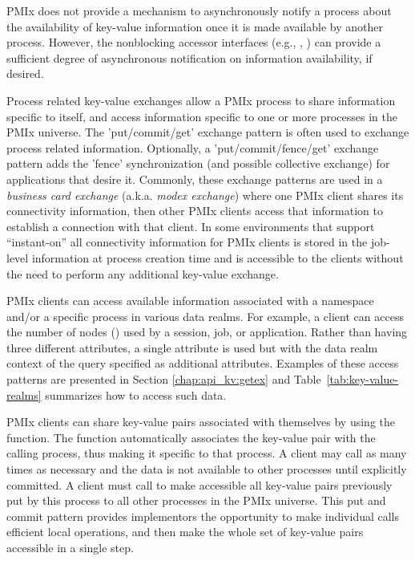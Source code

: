 \ac{PMIx} does not provide a mechanism to asynchronously notify a process about the availability of key-value information once it is made available by another process.
However, the nonblocking accessor interfaces (e.g., , ) can provide a sufficient degree of asynchronous notification on information availability, if desired.

Process related key-value exchanges allow a \ac{PMIx} process to share information specific to itself, and access information specific to one or more processes in the \ac{PMIx} universe.
The 'put/commit/get' exchange pattern is often used to exchange process related information.
Optionally, a 'put/commit/fence/get' exchange pattern adds the 'fence' synchronization (and possible collective exchange) for applications that desire it.
Commonly, these exchange patterns are used in a \emph{business card exchange} (a.k.a. \emph{modex exchange}) where one \ac{PMIx} client shares its connectivity information, then other \ac{PMIx} clients access that information to establish a connection with that client.
In some environments that support ``instant-on'' all connectivity information for \ac{PMIx} clients is stored in the job-level information at process creation time and is accessible to the clients without the need to perform any additional key-value exchange.

\ac{PMIx} clients can access available information associated with a namespace and/or a specific process in various data realms.
For example, a client can access the number of nodes () used by a session, job, or application.
Rather than having three different attributes, a single attribute is used but with the data realm context of the query specified as additional attributes.
Examples of these access patterns are presented in Section \ref{chap:api_kv:getex} and Table~\ref{tab:key-value-realms} summarizes how to access such data.

\ac{PMIx} clients can share key-value pairs associated with themselves by using the  function.
The  function automatically associates the key-value pair with the calling process, thus making it specific to that process.
A client may call  as many times as necessary and the data is not available to other processes until explicitly committed.
A client must call  to make accessible all key-value pairs previously put by this process to all other processes in the \ac{PMIx} universe.
This put and commit pattern provides implementors the opportunity to make individual  calls efficient local operations, and then make the whole set of key-value pairs accessible in a single step.

